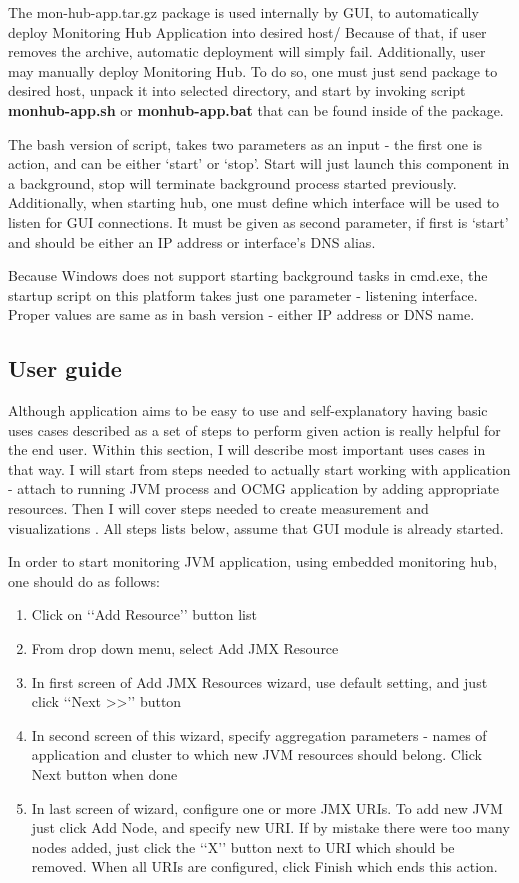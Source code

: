 The mon-hub-app.tar.gz package is used internally by GUI, to automatically deploy Monitoring Hub Application into desired host/ Because of that, if user removes the archive, automatic deployment will simply fail. Additionally, user may manually deploy Monitoring Hub. To do so, one must just send package to desired host, unpack it into selected directory, and start by invoking script {\bf monhub-app.sh} or {\bf monhub-app.bat} that can be found inside of the package. 

The bash version of script, takes two parameters as an input - the first one is action, and can be either \lq{}start\rq{} or \lq{}stop\rq{}. Start will just launch this component in a background, stop will terminate background process started previously. Additionally, when starting hub, one must define which interface will be used to listen for GUI connections. It must be given as second parameter, if first is \lq{}start\rq{} and should be either an IP address or interface\rq{}s DNS alias.  

Because Windows does not support starting background tasks in cmd.exe, the startup script on this platform takes just one parameter - listening interface. Proper values are same as in bash version - either IP  address or DNS name.

\subsection{User guide}

Although application aims to be easy to use and self-explanatory having basic uses cases described as a set of steps to perform given action is really helpful for the end user. Within this section, I will describe most important uses cases in that way. I will start from steps needed to actually start working with application - attach to running JVM process and OCMG application by adding appropriate resources. Then I will cover steps needed to create measurement and visualizations	. All steps lists below, assume that GUI module is already started.

In order to start monitoring JVM application, using embedded monitoring hub, one should do as follows:

\begin{enumerate}
\item Click on \lq\lq{}Add Resource\rq\rq{} button list 
\item From drop down menu, select Add JMX Resource
\item In first screen of Add JMX Resources wizard, use default setting, and just click \lq\lq{}Next >>\rq\rq{} button
\item In second screen of this wizard, specify aggregation parameters - names of application and cluster to which new JVM resources should belong. Click Next button when done
\item In last screen of wizard, configure one or more JMX URIs. To add new JVM just click Add Node, and specify new URI. If by mistake there were too many nodes added, just click the \lq\lq{}X\rq\rq{} button next to URI which should be removed. When all URIs are configured, click Finish which ends this action.
\end{enumerate}

